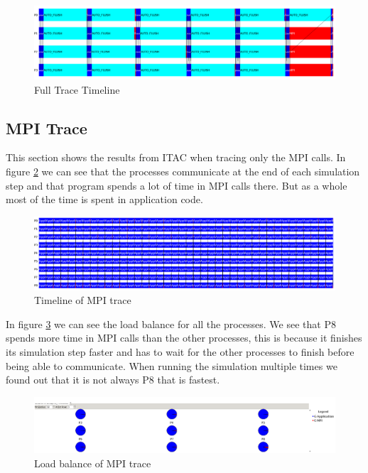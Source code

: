 \documentclass[a4paper, 12pt]{article}
\begin{document}
\begin{figure}[h]
        \centering
        \includegraphics[width=\textwidth]{event_timeline_loop_state.png}
        \caption{Full Trace Timeline}
        \label{fig:ftt}
\end{figure}

\subsection{MPI Trace}
This section shows the results from ITAC when tracing only the MPI calls.
In figure \ref{fig:mtt} we can see that the processes communicate at the end of
each simulation step and that program spends a lot of time in MPI calls there.
But as a whole most of the time is spent in application code.
\begin{figure}[h]
        \centering
        \includegraphics[width=\textwidth]{event_timeline.png}
        \caption{Timeline of MPI trace}
        \label{fig:mtt}
\end{figure}

In figure \ref{fig:mpiload} we can see the load balance for all the processes.
We see that P8 spends more time in MPI calls than the other processes, this is
because it finishes its simulation step faster and has to wait for the other
processes to finish before being able to communicate. When running the
simulation multiple times we found out that it is not always P8 that is fastest.
\begin{figure}[h]
        \centering
        \includegraphics[width=\textwidth]{load_balance.png}
        \caption{Load balance of MPI trace}
        \label{fig:mpiload}
\end{figure}
\end{document}
